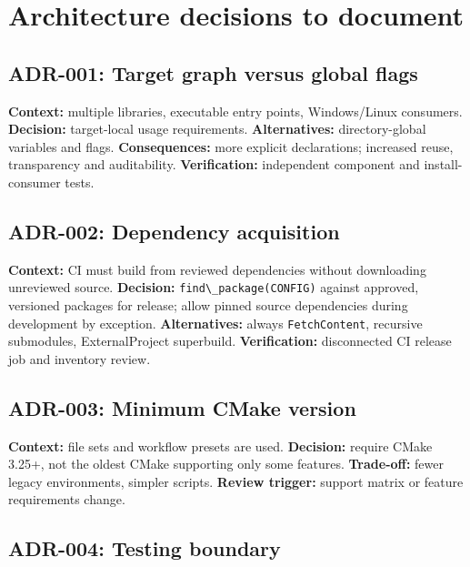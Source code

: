 \documentclass[11pt,letterpaper,oneside]{report}
\providecommand{\passthrough}[1]{#1}
\begin{document}
\chapter{Architecture decisions to
document}\label{architecture-decisions-to-document}

\section{ADR-001: Target graph versus global
flags}\label{adr-001-target-graph-versus-global-flags}

\textbf{Context:} multiple libraries, executable entry points,
Windows/Linux consumers. \textbf{Decision:} target-local usage
requirements. \textbf{Alternatives:} directory-global variables and
flags. \textbf{Consequences:} more explicit declarations; increased
reuse, transparency and auditability. \textbf{Verification:} independent
component and install-consumer tests.

\section{ADR-002: Dependency
acquisition}\label{adr-002-dependency-acquisition}

\textbf{Context:} CI must build from reviewed dependencies without
downloading unreviewed source. \textbf{Decision:}
\passthrough{\lstinline!find\_package(CONFIG)!} against approved,
versioned packages for release; allow pinned source dependencies during
development by exception. \textbf{Alternatives:} always
\passthrough{\lstinline!FetchContent!}, recursive submodules,
ExternalProject superbuild. \textbf{Verification:} disconnected CI
release job and inventory review.

\section{ADR-003: Minimum CMake
version}\label{adr-003-minimum-cmake-version}

\textbf{Context:} file sets and workflow presets are used.
\textbf{Decision:} require CMake 3.25+, not the oldest CMake supporting
only some features. \textbf{Trade-off:} fewer legacy environments,
simpler scripts. \textbf{Review trigger:} support matrix or feature
requirements change.

\section{ADR-004: Testing boundary}\label{adr-004-testing-boundary}
\end{document}
